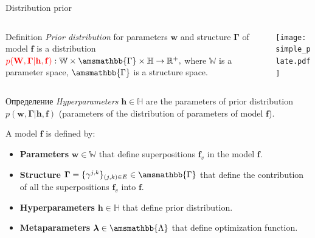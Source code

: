 \documentclass[usenames,dvipsnames,11pt,pdf,utf8,russian,aspectratio=43]{beamer}
\begin{document}
\begin{frame}{Distribution prior}
\footnotesize   
\begin{columns}
\begin{column}{0.6\textwidth}
   \begin{block}{Definition}
\textit{Prior distribution} for parameters $\mathbf{w}$ and structure $\boldsymbol{\Gamma}$ of model $\mathbf{f}$ is a distribution
$
    \textcolor{red}{p(\mathbf{W}, \boldsymbol{\Gamma}|\mathbf{h},\mathbf{f})}: \mathbb{W} \times \amsmathbb{\Gamma} \times \mathbb{H} \to \mathbb{R}^{+}, 
$
where $\mathbb{W}$ is a parameter space, $\amsmathbb{\Gamma}$ is a structure space.
\end{block}

\end{column}
\begin{column}{0.4\textwidth}  %
    \begin{center}
     \texttt{[image: simple\_plate.pdf]}
     \end{center}
\end{column}
\end{columns}
\vspace*{-0.5cm}
\begin{block}{Определение}
\textit{Hyperparameters} $\mathbf{h}\in \mathbb{H}$ are the parameters of prior distribution $p(\mathbf{w}, \boldsymbol{\Gamma}|\mathbf{h},\mathbf{f})$ (parameters of the distribution of parameters of model $\mathbf{f}$).
 
\end{block}
A model $\mathbf{f}$ is defined by:
\begin{itemize}
\item \textbf{Parameters} $\mathbf{w} \in \mathbb{W}$ that define superpositions  $\mathbf{f}_v$ in the model $\mathbf{f}$.
\item \textbf{Structure} $\boldsymbol{\Gamma}=\{\gamma^{j,k}\}_{(j,k)\in E} \in \amsmathbb{\Gamma}$ that define the contribution of all the superpositions  $\mathbf{f}_v$ into $\mathbf{f}$.
\item \textbf{Hyperparameters} $\mathbf{h} \in \mathbb{H}$ that define prior distribution.
\item \textbf{Metaparameters} $\boldsymbol{\lambda} \in \amsmathbb{\Lambda}$ that define optimization function.
\end{itemize}

\end{frame}
\end{document}
